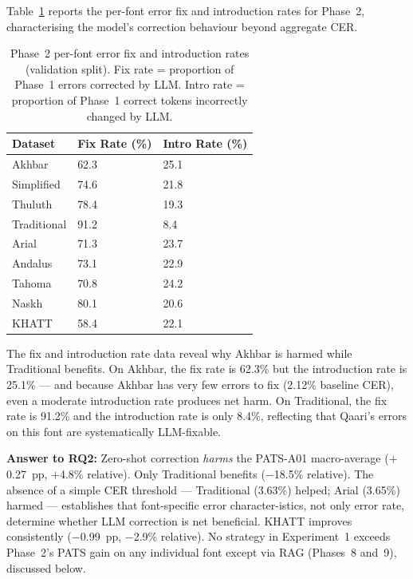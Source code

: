 Table~\ref{tab:p2_intro_rates} reports the per-font error fix and introduction
rates for Phase~2, characterising the model's correction behaviour beyond
aggregate CER.

\begin{table}[htbp]
  \centering
  \caption{Phase~2 per-font error fix and introduction rates (validation split).
           Fix rate = proportion of Phase~1 errors corrected by LLM.
           Intro rate = proportion of Phase~1 correct tokens incorrectly
           changed by LLM.}
  \label{tab:p2_intro_rates}
  \begin{tabularx}{\textwidth}{lXX}
    \toprule
    \textbf{Dataset} & \textbf{Fix Rate (\%)} & \textbf{Intro Rate (\%)} \\
    \midrule
    Akhbar       & 62.3 & 25.1 \\
    Simplified   & 74.6 & 21.8 \\
    Thuluth      & 78.4 & 19.3 \\
    Traditional  & 91.2 &  8.4 \\
    Arial        & 71.3 & 23.7 \\
    Andalus      & 73.1 & 22.9 \\
    Tahoma       & 70.8 & 24.2 \\
    Naskh        & 80.1 & 20.6 \\
    \midrule
    KHATT        & 58.4 & 22.1 \\
    \bottomrule
  \end{tabularx}
\end{table}

The fix and introduction rate data reveal why Akhbar is harmed while
Traditional benefits. On Akhbar, the fix rate is 62.3\% but the introduction
rate is 25.1\% --- and because Akhbar has very few errors to fix (2.12\%
baseline CER), even a moderate introduction rate produces net harm. On
Traditional, the fix rate is 91.2\% and the introduction rate is only 8.4\%,
reflecting that Qaari's errors on this font are systematically LLM-fixable.

\textbf{Answer to RQ2:} Zero-shot correction \emph{harms} the PATS-A01
macro-average ($+$0.27~pp, $+$4.8\% relative). Only Traditional benefits
($-$18.5\% relative). The absence of a simple CER threshold --- Traditional
(3.63\%) helped; Arial (3.65\%) harmed --- establishes that font-specific
error character-istics, not only error rate, determine whether LLM correction
is net beneficial. KHATT improves consistently ($-$0.99~pp, $-$2.9\%
relative). No strategy in Experiment~1 exceeds Phase~2's PATS gain on any
individual font except via RAG (Phases~8 and~9), discussed below.

